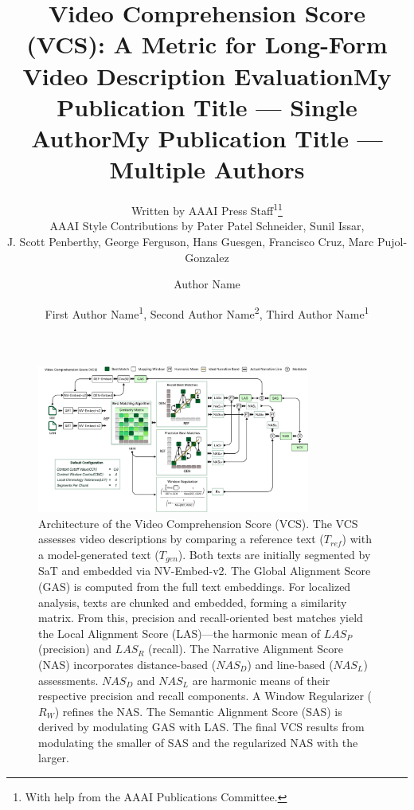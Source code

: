 \documentclass[letterpaper]{article} %
\title{Video Comprehension Score (VCS): A Metric for Long-Form Video Description Evaluation}
\author{
    Written by AAAI Press Staff\textsuperscript{\rm 1}\thanks{With help from the AAAI Publications Committee.}\\
    AAAI Style Contributions by Pater Patel Schneider,
    Sunil Issar,\\
    J. Scott Penberthy,
    George Ferguson,
    Hans Guesgen,
    Francisco Cruz\equalcontrib,
    Marc Pujol-Gonzalez\equalcontrib
}
\title{My Publication Title --- Single Author}
\author {
    Author Name
}
\title{My Publication Title --- Multiple Authors}
\author {
    First Author Name\textsuperscript{\rm 1},
    Second Author Name\textsuperscript{\rm 2},
    Third Author Name\textsuperscript{\rm 1}
}
\begin{document}
\maketitle

\begin{figure}[t]
\centering
\includegraphics[width=0.8\textwidth]{VCS}
\caption{Architecture of the Video Comprehension Score (VCS). The VCS assesses video descriptions by comparing a reference text ($T_{ref}$) with a model-generated text ($T_{gen}$). Both texts are initially segmented by SaT and embedded via NV-Embed-v2. The Global Alignment Score (GAS) is computed from the full text embeddings. For localized analysis, texts are chunked and embedded, forming a similarity matrix. From this, precision and recall-oriented best matches yield the Local Alignment Score (LAS)—the harmonic mean of $LAS_P$ (precision) and $LAS_R$ (recall). The Narrative Alignment Score (NAS) incorporates distance-based ($NAS_D$) and line-based ($NAS_L$) assessments. $NAS_D$ and $NAS_L$ are harmonic means of their respective precision and recall components. A Window Regularizer ($R_W$) refines the NAS. The Semantic Alignment Score (SAS) is derived by modulating GAS with LAS. The final VCS results from modulating the smaller of SAS and the regularized NAS with the larger.}
\label{fig:vcs-architecture}
\end{figure}
\end{document}
